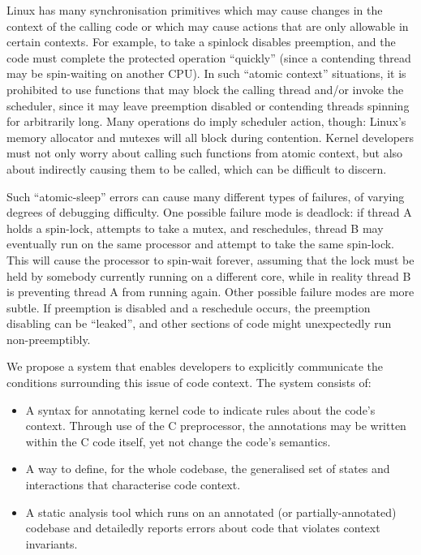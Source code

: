 \documentclass{article}
\begin{document}
Linux has many synchronisation primitives which may cause changes in the context of the calling code or which may cause actions that are only allowable in certain contexts.
For example, to take a spinlock disables preemption, and the code must complete the protected operation ``quickly'' (since a contending thread may be spin-waiting on another CPU).
In such ``atomic context'' situations, it is prohibited to use functions that may block the calling thread and/or invoke the scheduler, since it may leave preemption disabled or contending threads spinning for arbitrarily long.
Many operations do imply scheduler action, though: Linux's memory allocator and mutexes will all block during contention.
Kernel developers must not only worry about calling such functions from atomic context, but also about indirectly causing them to be called, which can be difficult to discern.

Such ``atomic-sleep'' errors can cause many different types of failures, of varying degrees of debugging difficulty.
One possible failure mode is deadlock: if thread A holds a spin-lock, attempts to take a mutex, and reschedules, thread B may eventually run on the same processor and attempt to take the same spin-lock.
This will cause the processor to spin-wait forever, assuming that the lock must be held by somebody currently running on a different core, while in reality thread B is preventing thread A from running again.
Other possible failure modes are more subtle. If preemption is disabled and a reschedule occurs, the preemption disabling can be ``leaked'', and other sections of code might unexpectedly run non-preemptibly.

We propose a system that enables developers to explicitly communicate the conditions surrounding this issue of code context. The system consists of:

\begin{itemize}
	\item
		A syntax for annotating kernel code to indicate rules about the code's context.
		Through use of the C preprocessor, the annotations may be written within the C code itself, yet not change the code's semantics.
	\item 
		A way to define, for the whole codebase, the generalised set of states and interactions that characterise code context.
	\item
		A static analysis tool which runs on an annotated (or partially-annotated) codebase and detailedly reports errors about code that violates context invariants.
\end{itemize}
\end{document}
